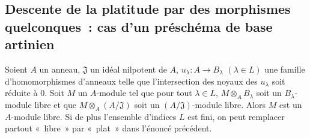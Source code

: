 \subsection{Descente de la platitude par des morphismes quelconques~: cas d'un préschéma de base artinien}
\label{subsection:IV.11.4-fr}

\begin{theorem}[11.4.1]
\label{IV.11.4.1-fr}
Soient $A$ un anneau, $\mathfrak J$ un idéal nilpotent de $A$,
$u_\lambda:A\to B_\lambda$ $(\lambda\in L)$ une famille d'homomorphismes
d'anneaux telle que l'intersection des noyaux des $u_\lambda$ soit réduite à
$0$. Soit $M$ un $A$-module tel que pour tout $\lambda\in L$,
$M\otimes_A B_\lambda$ soit un $B_\lambda$-module libre et que
$M\otimes_A(A/\mathfrak J)$ soit un $(A/\mathfrak J)$-module libre. Alors $M$
est un $A$-module libre. Si de plus l'ensemble d'indices $L$ est fini, on peut
remplacer partout «~libre~» par «~plat~» dans l'énoncé précédent.
\end{theorem}

